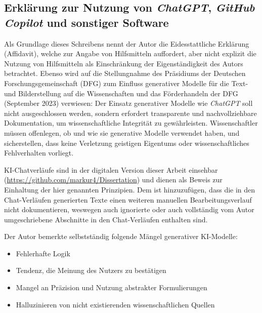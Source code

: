 

%
\label{sec:Additional_Methods}%

\subsection*{Erklärung zur Nutzung von \textit{ChatGPT}, \textit{GitHub Copilot} und sonstiger Software}

Als Grundlage dieses Schreibens nennt der Autor die Eidesstattliche Erklärung
(Affidavit), welche zur Angabe von Hilfsmitteln auffordert, aber nicht explizit
die Nutzung von Hilfsmitteln als Einschränkung der Eigenständigkeit des Autors
betrachtet. Ebenso wird auf die Stellungnahme des Präsidiums der Deutschen
Forschungsgemeinschaft (DFG) zum Einfluss generativer Modelle für die Text- und
Bilderstellung auf die Wissenschaften und das Förderhandeln der DFG (September
2023) verwiesen: Der Einsatz generativer Modelle wie \textit{ChatGPT} soll nicht
ausgeschlossen werden, sondern erfordert transparente und nachvollziehbare
Dokumentation, um wissenschaftliche Integrität zu gewährleisten. Wissenschaftler
müssen offenlegen, ob und wie sie generative Modelle verwendet haben, und
sicherstellen, dass keine Verletzung geistigen Eigentums oder wissenschaftliches
Fehlverhalten vorliegt.

KI-Chatverläufe sind in der digitalen Version dieser Arbeit einsehbar
(\url{https://github.com/markur4/Dissertation}) und dienen als Beweis zur
Einhaltung der hier genannten Prinzipien. Dem ist hinzuzufügen, dass die in den
Chat-Verläufen generierten Texte einen weiteren manuellen Bearbeitungsverlauf
nicht dokumentieren, weswegen auch ignorierte oder auch vollständig vom Autor
umgeschriebene Abschnitte in den Chat-Verläufen enthalten sind.

\noindent Der Autor bemerkte selbstständig folgende Mängel generativer KI-Modelle:
\begin{itemize}
    \item Fehlerhafte Logik
    \item Tendenz, die Meinung des Nutzers zu bestätigen
    \item Mangel an Präzision und Nutzung abstrakter Formulierungen
    \item Halluzinieren von nicht existierenden wissenschaftlichen Quellen
\end{itemize}

